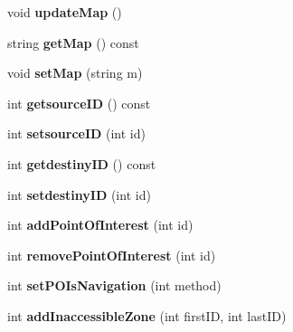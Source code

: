 \begin{DoxyCompactItemize}
\item 
\hypertarget{class_easy_pilot_a14b0155023bbf1318c2f033d3c015102}{}void {\bfseries update\+Map} ()\label{class_easy_pilot_a14b0155023bbf1318c2f033d3c015102}

\item 
\hypertarget{class_easy_pilot_aed5bc5d07b19f6c4ed75738c85fd9cd0}{}string {\bfseries get\+Map} () const \label{class_easy_pilot_aed5bc5d07b19f6c4ed75738c85fd9cd0}

\item 
\hypertarget{class_easy_pilot_ad39f859cf5dcc2b1d8c97e1cb098b1af}{}void {\bfseries set\+Map} (string m)\label{class_easy_pilot_ad39f859cf5dcc2b1d8c97e1cb098b1af}

\item 
\hypertarget{class_easy_pilot_a41d023b67a6e3d2ee303cc8e65b326ed}{}int {\bfseries getsource\+I\+D} () const \label{class_easy_pilot_a41d023b67a6e3d2ee303cc8e65b326ed}

\item 
\hypertarget{class_easy_pilot_a883991b124225932e5b683c2d09ce464}{}int {\bfseries setsource\+I\+D} (int id)\label{class_easy_pilot_a883991b124225932e5b683c2d09ce464}

\item 
\hypertarget{class_easy_pilot_acd4716401c9b31adcc121311361f516d}{}int {\bfseries getdestiny\+I\+D} () const \label{class_easy_pilot_acd4716401c9b31adcc121311361f516d}

\item 
\hypertarget{class_easy_pilot_a16a15fa19114daf0b59a40f976fcc5a1}{}int {\bfseries setdestiny\+I\+D} (int id)\label{class_easy_pilot_a16a15fa19114daf0b59a40f976fcc5a1}

\item 
\hypertarget{class_easy_pilot_a66c58ddfc69633955e44f81ed206a7c9}{}int {\bfseries add\+Point\+Of\+Interest} (int id)\label{class_easy_pilot_a66c58ddfc69633955e44f81ed206a7c9}

\item 
\hypertarget{class_easy_pilot_a24988647f06c8ebfb208775e491a2549}{}int {\bfseries remove\+Point\+Of\+Interest} (int id)\label{class_easy_pilot_a24988647f06c8ebfb208775e491a2549}

\item 
\hypertarget{class_easy_pilot_a462212efecccb55922602dda01f35e01}{}int {\bfseries set\+P\+O\+Is\+Navigation} (int method)\label{class_easy_pilot_a462212efecccb55922602dda01f35e01}

\item 
\hypertarget{class_easy_pilot_aaf295c560bda9154e7246b22525d44f7}{}int {\bfseries add\+Inaccessible\+Zone} (int first\+I\+D, int last\+I\+D)\label{class_easy_pilot_aaf295c560bda9154e7246b22525d44f7}


\end{DoxyCompactItemize}
